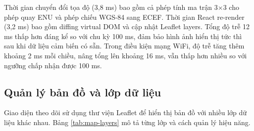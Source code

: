 \begin{table}[H]
\centering
{}
\caption{Phân tích độ trễ đầu cuối}
\label{tab:latency-breakdown}
\end{table}

Thời gian chuyển đổi tọa độ (3,8 ms) bao gồm cả phép tính ma trận 3$\times$3 cho phép quay ENU và phép chiếu WGS-84 sang ECEF. Thời gian React re-render (3,2 ms) bao gồm diffing virtual DOM và cập nhật Leaflet layers. Tổng độ trễ 12 ms thấp hơn đáng kể so với chu kỳ 100 ms, đảm bảo hình ảnh hiển thị tức thì sau khi dữ liệu cảm biến có sẵn. Trong điều kiện mạng WiFi, độ trễ tăng thêm khoảng 2 ms mỗi chiều, nâng tổng lên khoảng 16 ms, vẫn thấp hơn nhiều so với ngưỡng chấp nhận được 100 ms.

\subsection{Quản lý bản đồ và lớp dữ liệu}

\hspace{0.5cm} Giao diện theo dõi sử dụng thư viện Leaflet để hiển thị bản đồ với nhiều lớp dữ liệu khác nhau. Bảng \ref{tab:map-layers} mô tả từng lớp và cách quản lý hiệu năng.

